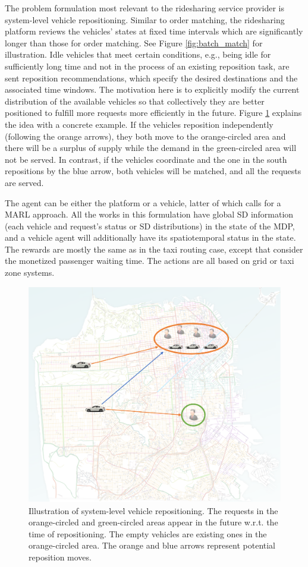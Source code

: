 \documentclass{article}
\begin{document}
The problem formulation most relevant to the ridesharing service provider is system-level vehicle repositioning. Similar to order matching, the ridesharing platform reviews the vehicles' states at fixed time intervals which are significantly longer than those for order matching. See Figure \ref{fig:batch_match} for illustration. Idle vehicles that meet certain conditions, e.g., being idle for sufficiently long time and not in the process of an existing reposition task, are sent reposition recommendations, which specify the desired destinations and the associated time windows. 
The motivation here is to explicitly modify the current distribution of the available vehicles so that collectively they are better positioned to fulfill more requests more efficiently in the future. Figure \ref{fig:reposition_system} explains the idea with a concrete example. If the vehicles reposition independently (following the orange arrows), they both move to the orange-circled area and there will be a surplus of supply while the demand in the green-circled area will not be served. In contrast, if the vehicles coordinate and the one in the south repositions by the blue arrow, both vehicles will be matched, and all the requests are served.

The agent can be either the platform or a vehicle, latter of which calls for a MARL approach. All the works in this formulation have global SD information (each vehicle and request's status or SD distributions) in the state of the MDP, and a vehicle agent will additionally have its spatiotemporal status in the state. The rewards are mostly the same as in the taxi routing case, except that \cite{mao2020dispatch} consider the monetized passenger waiting time. The actions are all based on grid or taxi zone systems.

\begin{figure}
\begin{center}
    \includegraphics[width=0.7\linewidth]{img/reposition_system.png}
	\caption{Illustration of system-level vehicle repositioning. The requests in the orange-circled and green-circled areas appear in the future w.r.t. the time of repositioning. The empty vehicles are existing ones in the orange-circled area. The orange and blue arrows represent potential reposition moves.}
	\label{fig:reposition_system}
\end{center}
\end{figure}
\end{document}
